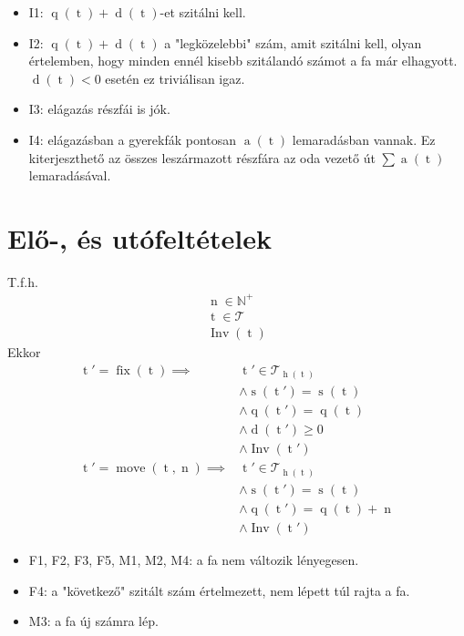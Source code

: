 \documentclass{article}
\newcommand*{\NaturalsP}{\ensuremath{\mathbb{N}^+}}
\newcommand*{\Trees}{\ensuremath{\mathcal{T}}}
\newcommand*{\fFix}{\ensuremath{\operatorname{fix}}}
\newcommand*{\fInv}{\ensuremath{\operatorname{Inv}}}
\newcommand*{\fMove}{\ensuremath{\operatorname{move}}}
\newcommand*{\sAccumulated}[1]{\ensuremath{\operatorname{a}\left(#1\right)}}
\newcommand*{\sDiff}[1]{\ensuremath{\operatorname{d}\left(#1\right)}}
\newcommand*{\sHeight}[1]{\ensuremath{\operatorname{h}\left(#1\right)}}
\newcommand*{\sPosition}[1]{\ensuremath{\operatorname{q}\left(#1\right)}}
\newcommand*{\sPrimes}[1]{\ensuremath{\operatorname{s}\left(#1\right)}}
\newcommand*{\vN}{\ensuremath{\operatorname{n}}}
\newcommand*{\vT}{\ensuremath{\operatorname{t}}}
\begin{document}
\begin{itemize}
\item I1: $\sPosition{\vT}+\sDiff{\vT}$-et szitálni kell.
\item I2: $\sPosition{\vT}+\sDiff{\vT}$ a "legközelebbi" szám, amit szitálni kell, olyan értelemben, 		hogy minden ennél kisebb szitálandó számot a fa már elhagyott.
	$\sDiff{\vT}<0$ esetén ez triviálisan igaz.
\item I3: elágazás részfái is jók.
\item I4: elágazásban a gyerekfák pontosan $\sAccumulated{\vT}$ lemaradásban vannak.
Ez kiterjeszthető az összes leszármazott részfára az oda vezető út
$ \sum \sAccumulated{\vT} $ lemaradásával.
\end{itemize}

\section{Elő-, és utófeltételek}

T.f.h.
\begin{align*}
\vN \in \NaturalsP \\
\vT \in \Trees \\
\fInv(\vT)
\end{align*}
Ekkor
\begin{align*}
\vT' = \fFix(\vT) \implies
	& \vT' \in \Trees_{\sHeight{\vT}} \tag{F1} \\
	& \land \sPrimes{\vT'} = \sPrimes{\vT} \tag{F2} \\
	& \land \sPosition{\vT'} = \sPosition{\vT} \tag{F3} \\
	& \land \sDiff{\vT'} \ge 0 \tag{F4} \\
	& \land \fInv(\vT') \tag{F5} \\
\vT' = \fMove(\vT, \vN) \implies
	& \vT' \in \Trees_{\sHeight{\vT}} \tag{M1} \\
	& \land \sPrimes{\vT'} = \sPrimes{\vT} \tag{M2} \\
	& \land \sPosition{\vT'} = \sPosition{\vT} + \vN \tag{M3} \\
	& \land \fInv(\vT') \tag{M4}
\end{align*}

\begin{itemize}
\item F1, F2, F3, F5, M1, M2, M4: a fa nem változik lényegesen.
\item F4: a "következő" szitált szám értelmezett, nem lépett túl rajta a fa.
\item M3: a fa új számra lép.
\end{itemize}
\end{document}
